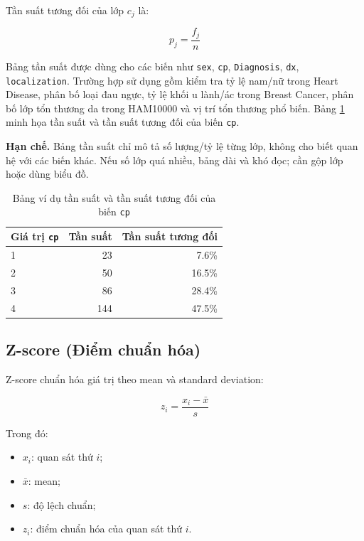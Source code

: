 Tần suất tương đối của lớp $c_j$ là:

\begin{equation}
p_j = \frac{f_j}{n}
\end{equation}

Bảng tần suất được dùng cho các biến như \texttt{sex}, \texttt{cp}, \texttt{Diagnosis}, \texttt{dx}, \texttt{localization}. Trường hợp sử dụng gồm kiểm tra tỷ lệ nam/nữ trong Heart Disease, phân bố loại đau ngực, tỷ lệ khối u lành/ác trong Breast Cancer, phân bố lớp tổn thương da trong HAM10000 và vị trí tổn thương phổ biến. Bảng \ref{tab:chapter1_freq_example} minh họa tần suất và tần suất tương đối của biến \texttt{cp}.

\textbf{Hạn chế.} Bảng tần suất chỉ mô tả số lượng/tỷ lệ từng lớp, không cho biết quan hệ với các biến khác. Nếu số lớp quá nhiều, bảng dài và khó đọc; cần gộp lớp hoặc dùng biểu đồ.

\begin{table}[H]
\centering
\caption{Bảng ví dụ tần suất và tần suất tương đối của biến \texttt{cp}}
\label{tab:chapter1_freq_example}
\small
\begin{tabular}{lrr}
\toprule
Giá trị \texttt{cp} & Tần suất & Tần suất tương đối \\
\midrule
1 & 23 & 7.6\% \\
2 & 50 & 16.5\% \\
3 & 86 & 28.4\% \\
4 & 144 & 47.5\% \\
\bottomrule
\end{tabular}
\end{table}

\subsection{Z-score (Điểm chuẩn hóa)}

Z-score chuẩn hóa giá trị theo mean và standard deviation:

\begin{equation}
z_i = \frac{x_i - \bar{x}}{s}
\end{equation}

Trong đó:
\begin{itemize}[leftmargin=1.6em,label=\textbullet]
 \item $x_i$: quan sát thứ $i$;
 \item $\bar{x}$: mean;
 \item $s$: độ lệch chuẩn;
 \item $z_i$: điểm chuẩn hóa của quan sát thứ $i$.
\end{itemize}

